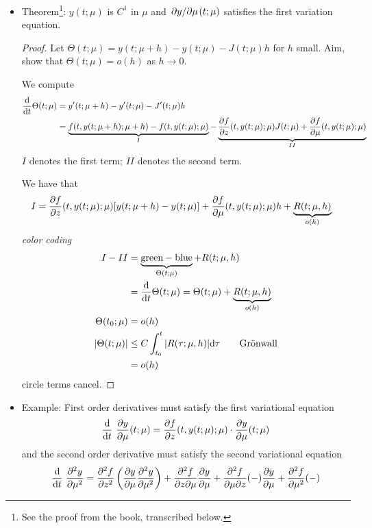 \documentclass[../notes.tex]{subfiles}
\begin{document}
\begin{itemize}
    \item Theorem\footnote{See the proof from the book, transcribed below.}: $y(t;\mu)$ is $C^1$ in $\mu$ and ${\pdv*{y}{\mu}}(t;\mu)$ satisfies the first variation equation.
    \begin{proof}
        Let $\Theta(t;\mu)=y(t;\mu+h)-y(t;\mu)-J(t;\mu)h$ for $h$ small. Aim, show that $\Theta(t;\mu)=o(h)$ as $h\to 0$.\par
        We compute
        \begin{align*}
            \dv{t}\Theta(t;\mu) &= y'(t;\mu+h)-y'(t;\mu)-J'(t;\mu)h\\
            &= \underbrace{f(t,y(t;\mu+h);\mu+h)-f(t,y(t;\mu);\mu)}_I-\underbrace{{\pdv{f}{z}}(t,y(t;\mu);\mu)J(t;\mu)+{\pdv{f}{\mu}}(t,y(t;\mu);\mu)}_{II}
        \end{align*}
        $I$ denotes the first term; $II$ denotes the second term.\par
        We have that
        \begin{align*}
            I &= {\pdv{f}{z}}(t,y(t;\mu);\mu)[y(t;\mu+h)-y(t;\mu)]+{\pdv{f}{\mu}}(t,y(t;\mu);\mu)h+\underbrace{R(t;\mu,h)}_{o(h)}
        \end{align*}
        \emph{color coding}
        \begin{align*}
            I-II &= \underbrace{\text{green}-\text{blue}}_{\Theta(t;\mu)}+R(t;\mu,h)\\
            &= \dv{t}\Theta(t;\mu) = \Theta(t;\mu)+\underbrace{R(t;\mu,h)}_{o(h)}\\
            \Theta(t_0;\mu) &= o(h)\\
            |\Theta(t;\mu)| &\leq C\int_{t_0}^t|R(\tau;\mu,h)|\dd\tau\tag*{Gr\"{o}nwall}\\
            &= o(h)
        \end{align*}
        circle terms cancel.
    \end{proof}
    \item Example: First order derivatives must satisfy the first variational equation
    \begin{equation*}
        \dv{t}~{\pdv{y}{\mu}}(t;\mu) = {\pdv{f}{z}}(t,y(t;\mu);\mu)\cdot{\pdv{y}{\mu}}(t;\mu)
    \end{equation*}
    and the second order derivative must satisfy the second variational equation
    \begin{equation*}
        \dv{t}~\pdv[2]{y}{\mu} = {\pdv[2]{f}{z}}\left( \pdv{y}{\mu}\pdv[2]{y}{\mu} \right)+\pdv{f}{z}{\mu}\pdv{y}{\mu}+{\pdv{f}{\mu}{z}}(-)\pdv{y}{\mu}+{\pdv[2]{f}{\mu}}(-)

\end{equation*}
\end{itemize}
\end{document}
